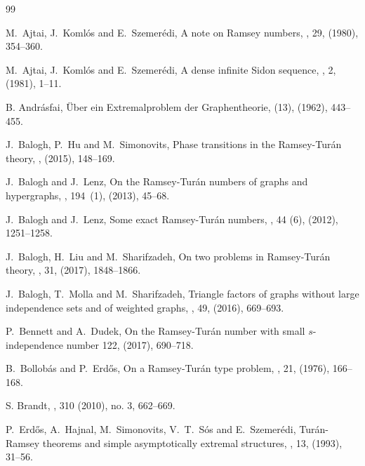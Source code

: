 \documentclass[10pt,a4paper]{article}
\theoremstyle{definition}
\begin{document}
\begin{thebibliography}{99}
	\setlength{\parskip}{0pt}
	\setlength{\itemsep}{0pt plus 0.3ex}
	\small

M.~Ajtai, J.~Koml\'os and E.~Szemer\'edi,
\newblock A note on Ramsey numbers,
, 29, (1980), 354--360.

M.~Ajtai, J.~Koml\'os and E.~Szemer\'edi,
\newblock A dense infinite Sidon sequence,
, 2, (1981), 1--11.

B. Andr\'asfai,
\newblock \"Uber ein Extremalproblem der Graphentheorie,
 (13), (1962), 443--455.

J.~Balogh, P.~Hu and M.~Simonovits,
\newblock Phase transitions in the Ramsey-Tur\'an theory,
, (2015), 148--169. 

J.~Balogh and J.~Lenz,
\newblock On the {R}amsey-{T}ur\'an numbers of graphs and hypergraphs,
, 194~(1), (2013), 45--68.

J.~Balogh and J.~Lenz,
\newblock Some exact {R}amsey-{T}ur\'an numbers,
, 44 (6), (2012), 1251--1258.

J.~Balogh, H.~Liu and M.~Sharifzadeh,
\newblock On two problems in Ramsey-Tur\'an theory,
, 31, (2017), 1848--1866.

J.~Balogh, T.~Molla and M.~Sharifzadeh,
\newblock Triangle factors of graphs without large independence sets and of weighted graphs,
, 49, (2016), 669--693.

P.~Bennett and A.~Dudek,
\newblock On the Ramsey-Tur\'an number with small $s$-independence number
 122, (2017), 690--718.

B.~Bollob\'as and P.~Erd\H os,
\newblock On a Ramsey-Tur\'an type problem,
, 21, (1976), 166--168.

S. Brandt,
, 
 310 (2010), no. 3, 662--669.

P.~Erd\H os, A.~Hajnal, M.~Simonovits, V.~T.~S\'os and E.~Szemer\'edi,
\newblock Tur\'an-Ramsey theorems and simple asymptotically extremal structures,
, 13, (1993), 31--56.


\end{thebibliography}
\end{document}
